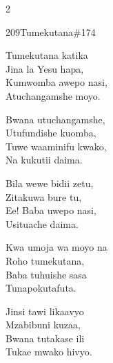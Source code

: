 \begin{multicols}{2}
\begin{hymn}{209}{Tumekutana}{\#174}
\begin{stanza}
Tumekutana katika\\
Jina la Yesu hapa,\\
Kumwomba awepo nasi,\\
Atuchangamshe moyo.
\end{stanza}
\begin{chorus}
Bwana utuchangamshe,\\
Utufundishe kuomba,\\
Tuwe waaminifu kwako,\\
Na kukutii daima.
\end{chorus}
\begin{stanza}
Bila wewe bidii zetu,\\
Zitakuwa bure tu,\\
Ee! Baba uwepo nasi,\\
Usituache daima.
\end{stanza}
\begin{stanza}
Kwa umoja wa moyo na\\
Roho tumekutana,\\
Baba tuhuishe sasa\\
Tunapokutafuta.
\end{stanza}
\begin{stanza}
Jinsi tawi likaavyo\\
Mzabibuni kuzaa,\\
Bwana tutakase ili\\
Tukae mwako hivyo.
\end{stanza}
\end{hymn}


\end{multicols}
